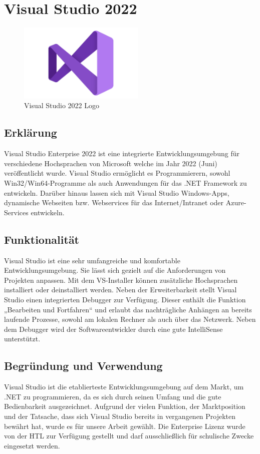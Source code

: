 \section{Visual Studio 2022}
\cite{VS2022}
\begin{figure}[h]
    \begin{center}
        \includegraphics*[width=6cm]{pics/Visual-Studio-Logo.png}
        \caption[VS 2022 Logo]{Visual Studio 2022 Logo \cite{VS2022logo}}
    \end{center}
\end{figure}
\subsection*{Erklärung}
Visual Studio Enterprise 2022 ist eine integrierte Entwicklungsumgebung für verschiedene Hochsprachen von Microsoft welche im Jahr 2022 (Juni) veröffentlicht wurde.
Visual Studio ermöglicht es Programmierern, sowohl Win32/Win64-Programme als
auch Anwendungen für das .NET Framework zu entwickeln. Darüber hinaus lassen sich
mit Visual Studio Windows-Apps, dynamische Webseiten bzw. Webservices für das
Internet/Intranet oder Azure-Services entwickeln.
\subsection*{Funktionalität}
Visual Studio ist eine sehr umfangreiche und komfortable Entwicklungsumgebung. Sie
lässt sich gezielt auf die Anforderungen von Projekten anpassen. Mit dem VS-Installer
können zusätzliche Hochsprachen installiert oder deinstalliert werden.
Neben der Erweiterbarkeit stellt Visual Studio einen integrierten Debugger zur Verfügung. Dieser enthält die Funktion „Bearbeiten und Fortfahren“ und erlaubt das
nachträgliche Anhängen an bereits laufende Prozesse, sowohl am lokalen Rechner als
auch über das Netzwerk. Neben dem Debugger wird der Softwareentwickler durch eine
gute IntelliSense unterstützt.
\subsection*{Begründung und Verwendung}
Visual Studio ist die etablierteste Entwicklungsumgebung auf dem Markt, um .NET
zu programmieren, da es sich durch seinen Umfang und die gute Bedienbarkeit ausgezeichnet. Aufgrund der vielen Funktion, der Marktposition und der Tatsache, dass
sich Visual Studio bereits in vergangenen Projekten bewährt hat, wurde es für unsere
Arbeit gewählt. Die Enterprise Lizenz wurde von der HTL zur Verfügung gestellt und
darf ausschließlich für schulische Zwecke eingesetzt werden.
\newpage

